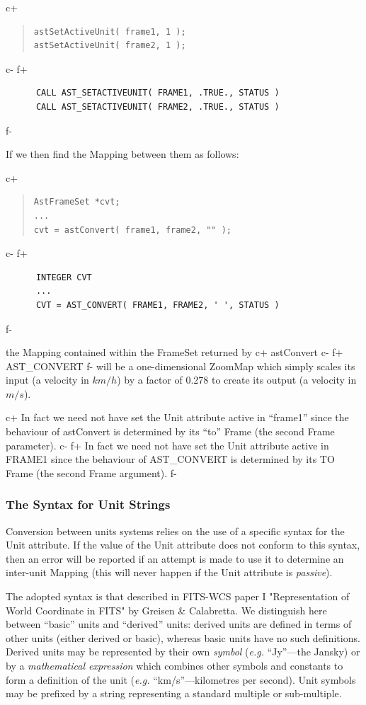 \documentclass[twoside,11pt]{article}
\begin{document}
c+
\begin{quote}
\small
\begin{verbatim}
astSetActiveUnit( frame1, 1 );
astSetActiveUnit( frame2, 1 );
\end{verbatim}
\normalsize
\end{quote}
c-
f+
\small
\begin{verbatim}
      CALL AST_SETACTIVEUNIT( FRAME1, .TRUE., STATUS )
      CALL AST_SETACTIVEUNIT( FRAME2, .TRUE., STATUS )
\end{verbatim}
\normalsize
f-

If we then find the Mapping between them as follows:

c+
\begin{quote}
\small
\begin{verbatim}
AstFrameSet *cvt;
...
cvt = astConvert( frame1, frame2, "" );
\end{verbatim}
\normalsize
\end{quote}
c-
f+
\small
\begin{verbatim}
      INTEGER CVT
      ...
      CVT = AST_CONVERT( FRAME1, FRAME2, ' ', STATUS )
\end{verbatim}
\normalsize
f-

the Mapping contained within the FrameSet returned by
c+
astConvert
c-
f+
AST\_CONVERT
f-
will be a one-dimensional ZoomMap which simply scales its input (a
velocity in $km/h$) by a factor of 0.278 to create its output (a velocity
in $m/s$).

c+
In fact we need not have set the Unit attribute active in ``frame1''
since the behaviour of astConvert is determined by its ``to'' Frame
(the second Frame parameter).
c-
f+
In fact we need not have set the Unit attribute active in FRAME1
since the behaviour of AST\_CONVERT is determined by its TO Frame
(the second Frame argument).
f-

\subsubsection{\label{ss:unitsyntax}The Syntax for Unit Strings}
Conversion between units systems relies on the use of a specific syntax
for the Unit attribute. If the value of the Unit attribute does not
conform to this syntax, then an error will be reported if an attempt is
made to use it to determine an inter-unit Mapping (this will never happen
if the Unit attribute is \emph{passive}).

The adopted syntax is that described in FITS-WCS paper I "Representation
of World Coordinate in FITS" by Greisen \& Calabretta. We distinguish
here between ``basic'' units and ``derived'' units: derived units are
defined in terms of other units (either derived or basic), whereas basic
units have no such definitions. Derived units may be represented by their
own \emph{symbol} (\emph{e.g.} ``Jy''---the Jansky) or by a
\emph{mathematical expression} which combines other symbols and constants
to form a definition of the unit (\emph{e.g.} ``km/s''---kilometres per
second). Unit symbols may be prefixed by a string representing a standard 
multiple or sub-multiple.
\end{document}
